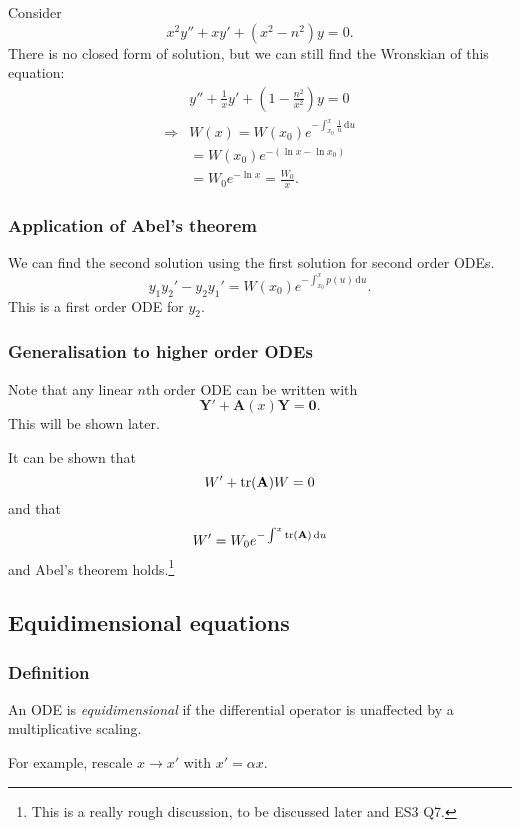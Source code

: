 \documentclass[a4paper]{article}
\begin{document}
    \begin{example}
        Consider
        \[
            x^2y''+xy'+(x^2-n^2)y=0
        .\]
        There is no closed form of solution, but we can still find the Wronskian of this equation:
        \[
            \begin{aligned}
                &y''+\frac{1}{x}y'+\left( 1-\frac{n^2}{x^2} \right) y=0\\
                \Longrightarrow &W(x)=W(x_0) e^{-\int_{x_0}^{x} \frac{1}{u} \,\mathrm{d}u}\\
                &=W(x_0) e^{-(\ln x-\ln x_0)}\\
                &= W_0 e^{-\ln x}=\frac{W_0}{x}.
            \end{aligned}
        \]
    \end{example}
    \subsubsection{Application of Abel's theorem}
    We can find the second solution using the first solution for second order ODEs.
    \[
        y_1y_2'-y_2y_1'=W(x_0)e^{-\int_{x_0}^{x} p(u) \,\mathrm{d}u}
    .\]
    This is a first order ODE for $y_2$.
    \subsubsection{Generalisation to higher order ODEs}
    Note that any linear $n$th order ODE can be written with 
    \[
        \mathbf{Y}'+\mathbf{A}(x)\mathbf{Y}=\mathbf{0}
    .\]
    This will be shown later.

    It can be shown that 
    \[
        W'+\trace(\mathbf{A})W=0
    \]
    and that 
    \[
        W'=W_0e^{-\int^{x} \trace(\mathbf{A}) \,\mathrm{d}u}
    \]
    and Abel's theorem holds.\footnote{This is a really rough discussion, to be discussed later and ES3 Q7.}
    \subsection{Equidimensional equations}
    \subsubsection{Definition}
    \begin{definition}
        An ODE is \textit{equidimensional} if the differential operator is unaffected by a multiplicative scaling.
    \end{definition}
    For example, rescale $ x \to x' $ with $ x'=\alpha x $.
\end{document}
